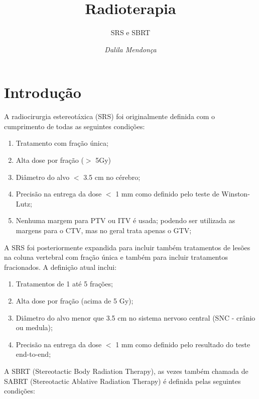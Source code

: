 \documentclass[11pt,a4paper]{article}
\title{\LobsterTwo\Huge{Radioterapia}}
\author{\LobsterTwo\Large{SRS e SBRT}\nocite{*}}
\date{\LobsterTwo\textit{Dalila Mendonça}}
\begin{document}
	\maketitle

\section{Introdução}

	A radiocirurgia estereotáxica (SRS) foi originalmente definida com o cumprimento de todas as seguintes condições:

	\begin{enumerate}[label=\textcolor{CarnationPink}{(\roman*)}]
		\item Tratamento com fração única;
		\item Alta dose por fração ($>$ 5Gy)
		\item Diâmetro do alvo $<$ 3.5 cm no cérebro;
		\item Precisão na entrega da dose $<$ 1 mm como definido pelo teste de Winston-Lutz\cite{lutz1988system};
		\item Nenhuma margem para PTV ou ITV é usada; podendo ser utilizada as margens para o CTV, mas no geral trata apenas o GTV; 
	\end{enumerate}

	A SRS foi posteriormente expandida para incluir também tratamentos de lesões na coluna vertebral com fração única e também para incluir tratamentos fracionados. A definição atual inclui:

	\begin{enumerate}[label=\textcolor{CarnationPink}{(\roman*)}]
		\item Tratamentos de 1 até 5 frações;
		\item Alta dose por fração (acima de 5 Gy);
		\item Diâmetro do alvo menor que 3.5 cm no sistema nervoso central (SNC  - crânio ou medula);
		\item Precisão na entrega da dose $<$ 1 mm como definido pelo resultado do teste end-to-end;
	\end{enumerate}

	A SBRT (Stereotactic Body Radiation Therapy), as vezes também chamada de SABRT (Stereotactic Ablative Radiation Therapy) é definida pelas seguintes condições:
\end{document}
